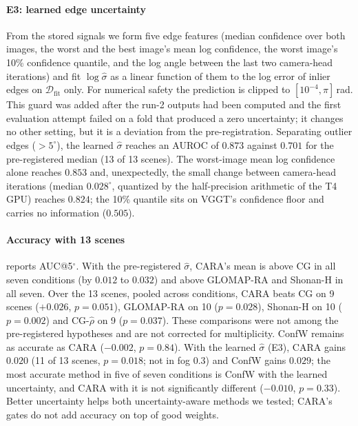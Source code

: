 \paragraph*{E3: learned edge uncertainty} From the stored signals we form five edge features (median confidence over both images, the worst and the best image's mean log confidence, the worst image's 10\% confidence quantile, and the log angle between the last two camera-head iterations) and fit $\log\hat\sigma$ as a linear function of them to the log error of inlier edges on $\mathcal{D}_{\mathrm{fit}}$ only. For numerical safety the prediction is clipped to $[10^{-4},\pi]$\,rad. This guard was added after the run-2 outputs had been computed and the first evaluation attempt failed on a fold that produced a zero uncertainty; it changes no other setting, but it is a deviation from the pre-registration. Separating outlier edges ($>5^\circ$), the learned $\hat\sigma$ reaches an AUROC of $0.873$ against $0.701$ for the pre-registered median (13 of 13 scenes). The worst-image mean log confidence alone reaches $0.853$ and, unexpectedly, the small change between camera-head iterations (median $0.028^\circ$, quantized by the half-precision arithmetic of the T4 GPU) reaches $0.824$; the 10\% quantile sits on VGGT's confidence floor and carries no information ($0.505$).



\paragraph*{Accuracy with 13 scenes}  reports AUC@5$^\circ$. With the pre-registered $\hat\sigma$, CARA's mean is above CG in all seven conditions (by $0.012$ to $0.032$) and above GLOMAP-RA and Shonan-H in all seven. Over the 13 scenes, pooled across conditions, CARA beats CG on 9 scenes ($+0.026$, $p=0.051$), GLOMAP-RA on 10 ($p=0.028$), Shonan-H on 10 ($p=0.002$) and CG-$\hat\rho$ on 9 ($p=0.037$). These comparisons were not among the pre-registered hypotheses and are not corrected for multiplicity. ConfW remains as accurate as CARA ($-0.002$, $p=0.84$). With the learned $\hat\sigma$ (E3), CARA gains $0.020$ (11 of 13 scenes, $p=0.018$; not in fog $0.3$) and ConfW gains $0.029$; the most accurate method in five of seven conditions is ConfW with the learned uncertainty, and CARA with it is not significantly different ($-0.010$, $p=0.33$). Better uncertainty helps both uncertainty-aware methods we tested; CARA's gates do not add accuracy on top of good weights.

